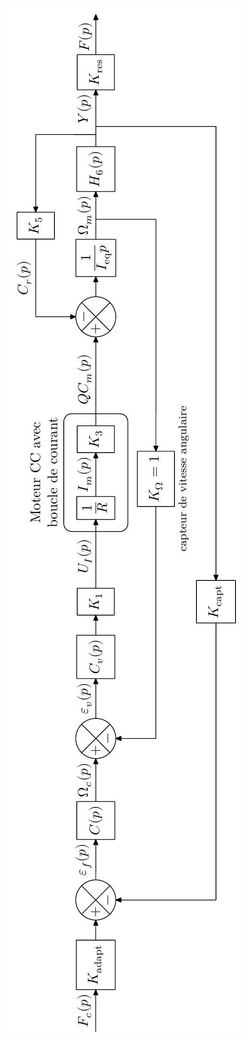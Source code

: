 \documentclass[10pt]{article}
\begin{document}
\begin{center}
\includegraphics[max width=\textwidth]{2024_03_20_0c3cf888f6e04b1986bcg-09}
\end{center}
\end{document}
